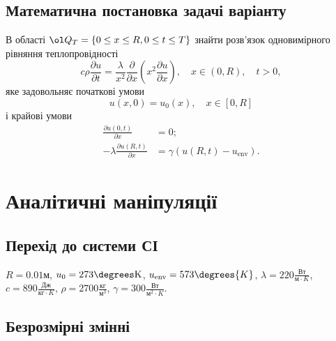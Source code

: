 \subsection{Математична постановка задачі варіанту}

В області $\ol Q_T = \{0 \le x \le R, 0 \le t \le T\}$ знайти розв'язок одновимірного рівняння теплопровідності
\begin{equation}
    c \rho \frac{\partial u}{\partial t} = \frac{\lambda}{x^2} \frac{\partial}{\partial x} \left( x^2 \frac{\partial u}{\partial x} \right), \quad x \in (0, R), \quad t > 0,
\end{equation}
яке задовольняє початкові умови
\begin{equation}
    u(x, 0) = u_0(x), \quad x \in [0, R]
\end{equation}
і крайові умови
\begin{equation}
    \begin{aligned}
        \frac{\partial u(0, t)}{\partial x} &= 0; \\
        -\lambda \frac{\partial u(R, t)}{\partial x} &= \gamma ( u(R, t) - u_\text{env} ).
    \end{aligned}
\end{equation}

\section{Аналітичні маніпуляції}

\subsection{Перехід до системи СІ}

$R = 0.01 \text{м}$, $u_0 = 273 \degrees \text{K}$, $u_{\text{env}} = 573 \degrees {K}$, $\lambda = 220 \frac{\text{Вт}}{\text{м} \cdot K}$, $c = 890 \frac{\text{Дж}}{\text{кг} \cdot K}$, $\rho = 2700 \frac{\text{кг}}{\text{м}^3}$, $\gamma = 300 \frac{\text{Вт}}{\text{м}^2 \cdot K}$.

\subsection{Безрозмірні змінні}

